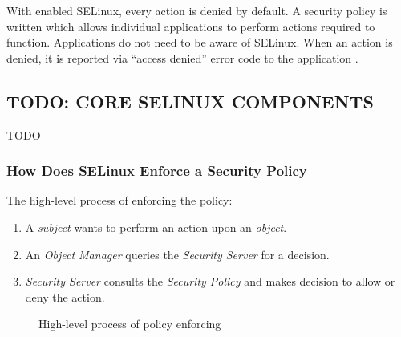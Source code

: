 With enabled SELinux, every action is denied by default. A security policy is
written which allows individual applications to perform actions required to
function. Applications do not need to be aware of SELinux. When an action is
denied, it is reported via ``access denied'' error code to the application
\cite{centoshowto}.

\subsection{TODO: CORE SELINUX COMPONENTS}

TODO

\subsubsection{How Does SELinux Enforce a Security Policy}
The high-level process of enforcing the policy:
\begin{enumerate}
    \item A \emph{subject} wants to perform an action upon an \emph{object}.
    \item An \emph{Object Manager} queries the \emph{Security Server} for a
    decision.
    \item \emph{Security Server} consults the \emph{Security Policy}
    and makes decision to allow or deny the action.
\end{enumerate}

\begin{figure}
    \caption{High-level process of policy enforcing}
\end{figure}

